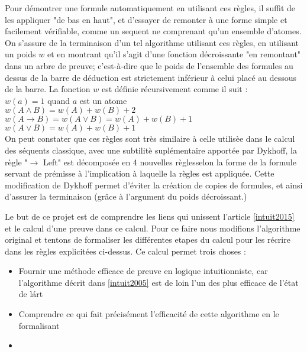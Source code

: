 Pour d\'emontrer une formule automatiquement en utilisant ces r\`egles, il suffit de les appliquer "de bas en haut", et d'essayer de remonter \`a une forme simple et facilement v\'erifiable, comme un sequent ne comprenant qu'un ensemble d'atomes.
On s'assure de la terminaison d'un tel algorithme utilisant ces r\`egles, en utilisant un poids $w$ et en montrant qu'il s'agit d'une fonction d\'ecroissante "en remontant" dans un arbre de preuve; c'est-\`a-dire que le poids de l'ensemble des formules au dessus de la barre de d\'eduction est strictement inférieur à celui plac\'e au dessous de la barre. La fonction $w$ est d\'efinie r\'ecursivement comme il suit : \\
$w(a) = 1$ quand $a$ est un atome \\
$w(A \land B) = w(A) + w(B) + 2 $ \\
$w(A \to B ) = w(A \lor B) = w(A) + w(B) + 1$\\
$w(A \lor B) = w(A) + w(B) + 1$\\

On peut constater que ces r\`egles sont tr\`es similaire \`a celle utilis\`ee dans le calcul des s\'equents classique, avec une subtilit\`e supl\'ementaire apport\'ee par Dykhoff, la r\`egle "$\to$ Left" est d\'ecompos\'ee en 4 nouvelles r\`eglesselon la forme de la formule servant de pr\'emisse à l'implication à laquelle la r\`egles est appliqu\'ee. Cette modification de Dykhoff permet d'\'eviter la cr\'eation de copies de formules, et ainsi d'assurer la terminaison (gr\^ace \`a l'argument du poids d\'ecroissant.)

Le but de ce projet est de comprendre les liens qui unissent l'article \ref{intuit2015} et le calcul d'une preuve dans ce calcul. Pour ce faire nous modifions l'algorithme original et tentons de formaliser les diff\'erentes etapes du calcul pour les r\'ecrire dans les r\`egles explicit\'ees ci-dessus. Ce calcul permet trois choses :

\begin{itemize}
\item Fournir une m\'ethode efficace de preuve en logique intuitionniste, car l'algorithme d\'ecrit dans \ref{intuit2005} est de loin l'un des plus efficace de l'\'etat de l\'art
\item Comprendre ce qui fait pr\'ecis\'ement l'efficacit\'e de cette algorithme en le formalisant
\item [TROUVER UNE TROISIEME RAISON]
\end{itemize}
